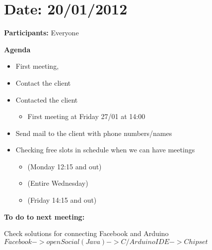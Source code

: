 
\section{Date: 20/01/2012}

\textbf{Participants:} Everyone

\textbf{Agenda}

\begin{itemize}
	\item First meeting, 
	\item Contact the client
	\item Contacted the client
	\begin{itemize}\item First meeting at Friday 27/01 at 14:00 \end{itemize}


	\item Send mail to the client with phone numbers/names

	\item Checking free slots in schedule when we can have meetings
	\begin{itemize}
		\item (Monday 12:15 and out)
		\item (Entire Wednesday)
		\item (Friday 14:15 and out)
	\end{itemize}
\end{itemize}

\textbf{To do to next meeting:}

Check solutions for connecting Facebook and Arduino\newline
$Facebook -> openSocial (Java) -> C/Arduino IDE -> Chipset$

